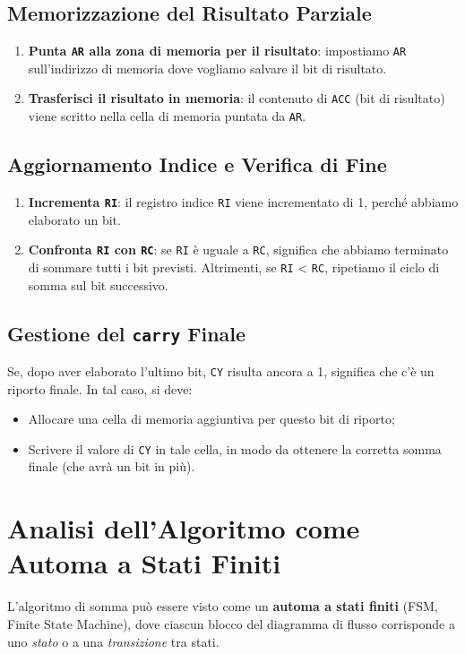 \documentclass[a4paper,12pt]{report}
\begin{document}
\subsection{Memorizzazione del Risultato Parziale}
\begin{enumerate}
    \item \textbf{Punta \texttt{AR} alla zona di memoria per il risultato}: impostiamo \texttt{AR} sull'indirizzo di memoria dove vogliamo salvare il bit di risultato.
    \item \textbf{Trasferisci il risultato in memoria}: il contenuto di \texttt{ACC} (bit di risultato) viene scritto nella cella di memoria puntata da \texttt{AR}.
\end{enumerate}

\subsection{Aggiornamento Indice e Verifica di Fine}
\begin{enumerate}
    \item \textbf{Incrementa \texttt{RI}}: il registro indice \texttt{RI} viene incrementato di 1, perché abbiamo elaborato un bit.
    \item \textbf{Confronta \texttt{RI} con \texttt{RC}}: se \texttt{RI} è uguale a \texttt{RC}, significa che abbiamo terminato di sommare tutti i bit previsti. Altrimenti, se \texttt{RI} < \texttt{RC}, ripetiamo il ciclo di somma sul bit successivo.
\end{enumerate}

\subsection{Gestione del \texttt{carry} Finale}
Se, dopo aver elaborato l'ultimo bit, \texttt{CY} risulta ancora a 1, significa che c'è un riporto finale. In tal caso, si deve:
\begin{itemize}
    \item Allocare una cella di memoria aggiuntiva per questo bit di riporto;
    \item Scrivere il valore di \texttt{CY} in tale cella, in modo da ottenere la corretta somma finale (che avrà un bit in più).
\end{itemize}

\section{Analisi dell'Algoritmo come Automa a Stati Finiti}
L'algoritmo di somma può essere visto come un \textbf{automa a stati finiti} (FSM, Finite State Machine), dove ciascun blocco del diagramma di flusso corrisponde a uno \emph{stato} o a una \emph{transizione} tra stati. 
\end{document}
